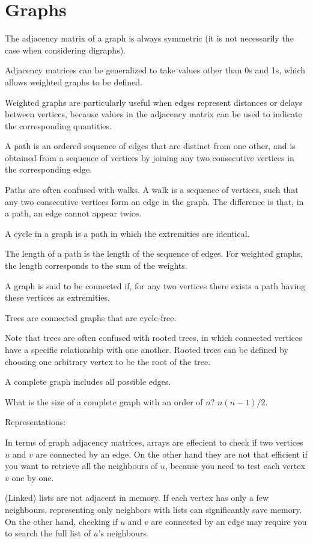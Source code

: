 \section{Graphs}

The adjacency matrix of a graph is always symmetric
(it is not necessarily the case when considering digraphs).

Adjacency matrices can be generalized to take values other than 0s and 1s,
which allows weighted graphs to be defined.

Weighted graphs are particularly useful when edges represent distances or delays between vertices,
because values in the adjacency matrix can be used to indicate the corresponding quantities.

A path is an ordered sequence of edges that are distinct from one other, and is obtained from
a sequence of vertices by joining any two consecutive vertices in the corresponding edge.

Paths are often confused with walks. A walk is a sequence of vertices, such that
any two consecutive vertices form an edge in the graph. The difference is that,
in a path, an edge cannot appear twice.

A cycle in a graph is a path in which the extremities are identical.

The length of a path is the length of the sequence of edges.
For weighted graphs, the length corresponds to the sum of the weights.

A graph is said to be connected if, for any two vertices there exists a path having these vertices as extremities.

Trees are connected graphs that are cycle-free.

Note that trees are often confused with rooted trees, in which connected vertices have a specific relationship with one another.
Rooted trees can be defined by choosing one arbitrary vertex to be the root of the tree.

A complete graph includes all possible edges.

What is the size of a complete graph with an order of $n$? $n (n-1) / 2$.

Representations:

In terms of graph adjacency matrices, arrays are effecient to check if two vertices $u$ and $v$ are
connected by an edge. On the other hand they are not that efficient if you want to retrieve all the
neighbours of $u$, because you need to test each vertex $v$ one by one.

(Linked) lists are not adjacent in memory.
If each vertex has only a few neighbours, representing only neighbors with lists can significantly save memory.
On the other hand, checking if $u$ and $v$ are connected by an edge may require you to search the full list of $u$'s neighbours.

